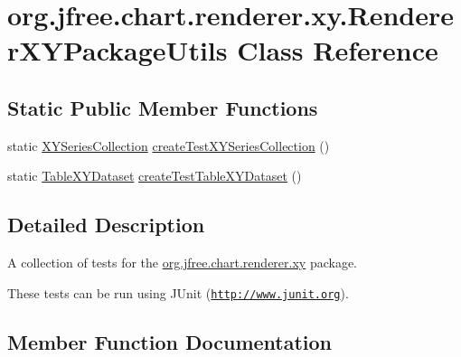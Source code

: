 \hypertarget{classorg_1_1jfree_1_1chart_1_1renderer_1_1xy_1_1_renderer_x_y_package_utils}{}\section{org.\+jfree.\+chart.\+renderer.\+xy.\+Renderer\+X\+Y\+Package\+Utils Class Reference}
\label{classorg_1_1jfree_1_1chart_1_1renderer_1_1xy_1_1_renderer_x_y_package_utils}
\subsection*{Static Public Member Functions}
\begin{DoxyCompactItemize}
\item 
static \mbox{\hyperlink{classorg_1_1jfree_1_1data_1_1xy_1_1_x_y_series_collection}{X\+Y\+Series\+Collection}} \mbox{\hyperlink{classorg_1_1jfree_1_1chart_1_1renderer_1_1xy_1_1_renderer_x_y_package_utils_a35efc8ca9354afb4dcedb39280bb0a60}{create\+Test\+X\+Y\+Series\+Collection}} ()
\item 
static \mbox{\hyperlink{interfaceorg_1_1jfree_1_1data_1_1xy_1_1_table_x_y_dataset}{Table\+X\+Y\+Dataset}} \mbox{\hyperlink{classorg_1_1jfree_1_1chart_1_1renderer_1_1xy_1_1_renderer_x_y_package_utils_ad27c39516a0cf16e76f44990ce13766b}{create\+Test\+Table\+X\+Y\+Dataset}} ()
\end{DoxyCompactItemize}


\subsection{Detailed Description}
A collection of tests for the \mbox{\hyperlink{namespaceorg_1_1jfree_1_1chart_1_1renderer_1_1xy}{org.\+jfree.\+chart.\+renderer.\+xy}} package. 

These tests can be run using J\+Unit (\href{http://www.junit.org}{\tt http\+://www.\+junit.\+org}). 

\subsection{Member Function Documentation}
\mbox{\label{classorg_1_1jfree_1_1chart_1_1renderer_1_1xy_1_1_renderer_x_y_package_utils_ad27c39516a0cf16e76f44990ce13766b}} 

